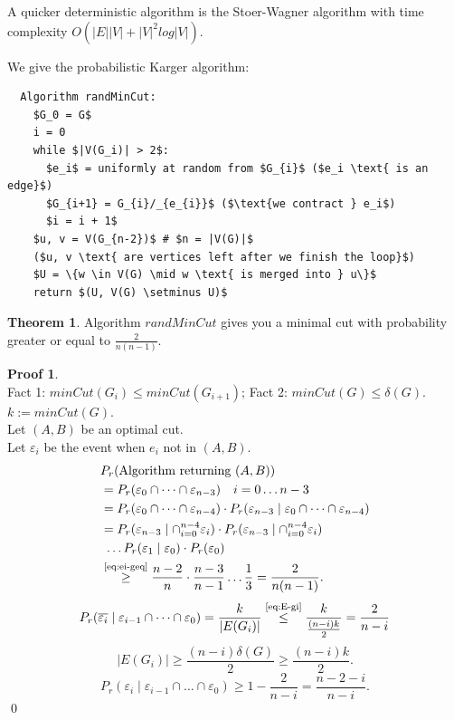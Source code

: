 \documentclass[a4paper, 12pt]{book}
\theoremstyle{definition}
\newtheorem{theorem}[counter]{Theorem}
\newtheorem{pro}[counter]{Proof}
\theoremstyle{remark}
\begin{document}
A quicker deterministic algorithm is the Stoer-Wagner algorithm with time complexity $O\left(|E| |V| + |V|^2 log |V|\right)$.

We give the probabilistic Karger algorithm:
\begin{lstlisting}
  Algorithm randMinCut:
    $G_0 = G$
    i = 0
    while $|V(G_i)| > 2$:
      $e_i$ = uniformly at random from $G_{i}$ ($e_i \text{ is an edge}$)
      $G_{i+1} = G_{i}/_{e_{i}}$ ($\text{we contract } e_i$)
      $i = i + 1$
    $u, v = V(G_{n-2})$ # $n = |V(G)|$ 
    ($u, v \text{ are vertices left after we finish the loop}$)
    $U = \{w \in V(G) \mid w \text{ is merged into } u\}$
    return $(U, V(G) \setminus U)$
\end{lstlisting}
\begin{theorem}
  Algorithm $randMinCut$ gives you a minimal cut with probability greater or equal to $\frac{2}{n(n-1)}$.
\end{theorem}
\begin{pro} \text{} \\
  Fact 1: $minCut(G_i) \leq minCut(G_{i+1})$;
  Fact 2: $minCut(G) \leq \delta(G)$. \\
  $k := minCut(G)$. \\
  Let $(A,B)$ be an optimal cut. \\
  Let $\varepsilon_i$ be the event when $e_i$ not in $(A,B)$.
  \begin{align}
    &P_r(\text{Algorithm returning } (A,B)) \nonumber \\
    &= P_r(\varepsilon_0 \cap \dots \cap \varepsilon_{n-3}) \quad i = 0 \dots n-3 \nonumber  \\
    &= P_r(\varepsilon_0 \cap \dots \cap \varepsilon_{n-4}) \cdot
      P_r(\varepsilon_{n-3} \mid \varepsilon_0 \cap \dots \cap \varepsilon_{n-4}) \nonumber  \\
    &= P_r(\varepsilon_{n-3} \mid \cap_{i=0}^{n-4} \varepsilon_i) \cdot
      P_r(\varepsilon_{n-3} \mid \cap_{i=0}^{n-4} \varepsilon_i) \nonumber \\
    &\text{ } \dots P_r(\varepsilon_1 \mid \varepsilon_0) \cdot P_r(\varepsilon_0) \nonumber \\
    &\stackrel{\refeq{eq:ei-geq}}{\geq} \frac{n-2}{n} \cdot \frac{n-3}{n-1} \dots \frac{1}{3} = \frac{2}{n(n-1)}. \nonumber
  \end{align}
  \begin{equation*}
    P_r(\overline{\varepsilon_i} \mid \varepsilon_{i-1} \cap \dots \cap \varepsilon_0) =
      \frac{k}{|E(G_i)|} \stackrel{\refeq{eq:E-gi}}{\leq} \frac{k}{\frac{(n-i)k}{2}} = \frac{2}{n-i}
  \end{equation*}
  \begin{equation}
    \label{eq:E-gi}
    |E(G_i)| \geq \frac{(n-i) \delta(G)}{2} \geq \frac{(n-i)k}{2}.
  \end{equation}
  \begin{equation}
    \label{eq:ei-geq}
    P_r(\varepsilon_i \mid \varepsilon_{i-1} \cap \dots \cap \varepsilon_0) \geq 1 - \frac{2}{n-i} = \frac{n-2-i}{n-i}.
  \end{equation}
  \qed
\end{pro}
\end{document}
